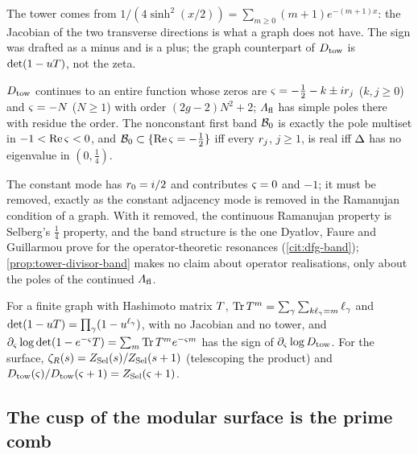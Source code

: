 The tower comes from $1/(4\sinh^2(x/2)) = \sum_{m\ge0}(m+1)e^{-(m+1)x}$: the
Jacobian of the two transverse directions is what a graph does not have. The
sign was drafted as a minus and is a plus; the graph counterpart of $D_{\mathrm{tow}}$
is $\det(1-uT)$, not the zeta.

\begin{proposition}
\label{prop:tower-divisor-band}
$D_{\mathrm{tow}}$ continues to an entire function whose zeros are
$\varsigma = -\tfrac12-k\pm ir_{j}$ ($k,j\ge0$) and $\varsigma = -N$ ($N\ge1$)
with order $(2g-2)N^2+2$; $\varLambda_{\mathrm{fl}}$ has simple poles there with residue the
order. The nonconstant first band $\mathcal B_0$ is exactly the pole multiset
in $-1<\operatorname{Re}\varsigma<0$, and
$\mathcal B_0\subset\{\operatorname{Re}\varsigma = -\tfrac12\}$ iff every $r_{j}$, $j\ge1$, is
real iff $\Delta$ has no eigenvalue in $(0,\tfrac14)$.
\end{proposition}

The constant mode has $r_{0} = i/2$ and contributes $\varsigma = 0$ and $-1$;
it must be removed, exactly as the constant adjacency mode is removed in the
Ramanujan condition of a graph. With it removed, the continuous Ramanujan
property is Selberg's $\tfrac14$ property, and the band structure is the one
Dyatlov, Faure and Guillarmou prove for the operator-theoretic resonances
(\cref{cit:dfg-band}); \cref{prop:tower-divisor-band} makes no claim about
operator realisations, only about the poles of the continued $\varLambda_{\mathrm{fl}}$.

\begin{proposition}
\label{prop:graph-tower-ruelle}
For a finite graph with Hashimoto matrix $T$, $\operatorname{Tr}T^m =
\sum_{\gamma}\sum_{k\ell_\gamma = m}\ell_\gamma$ and $\det(1-uT) =
\prod_\gamma(1-u^{\ell_\gamma})$, with no Jacobian and no tower, and
$\partial_{\varsigma}\log\det(1-e^{-\varsigma}T) = \sum_m\operatorname{Tr}T^m e^{-\varsigma m}$
has the sign of $\partial_{\varsigma}\log D_{\mathrm{tow}}$. For the surface,
$\zeta_{R}(s) = Z_{\mathrm{Sel}}(s)/Z_{\mathrm{Sel}}(s+1)$ (telescoping the product) and
$D_{\mathrm{tow}}(\varsigma)/D_{\mathrm{tow}}(\varsigma+1) = Z_{\mathrm{Sel}}(\varsigma+1)$.
\end{proposition}

\subsection{The cusp of the modular surface is the prime comb}

